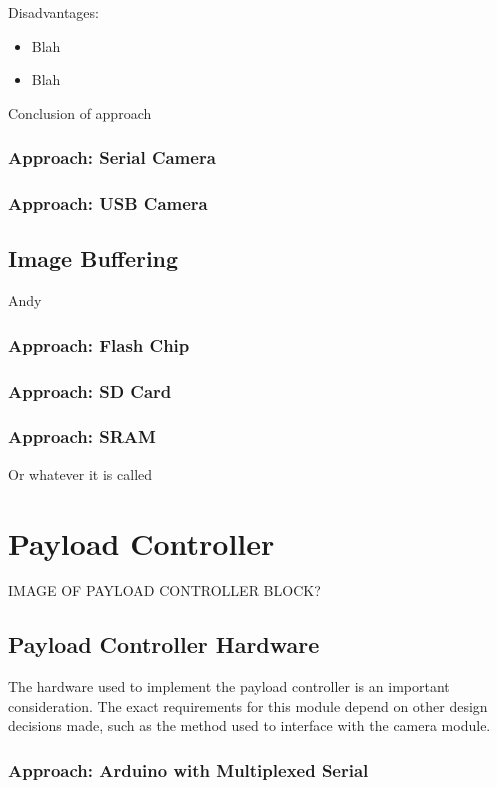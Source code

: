 \documentclass[oneside]{ecsgdp}         %
\begin{document}
Disadvantages:
\begin{itemize}
\item Blah
\item Blah
\end{itemize}

Conclusion of approach

\subsubsection{Approach: Serial Camera}

\subsubsection{Approach: USB Camera}


\subsection{Image Buffering}
Andy

\subsubsection{Approach: Flash Chip}

\subsubsection{Approach: SD Card}

\subsubsection{Approach: SRAM}
Or whatever it is called

\section{Payload Controller}
IMAGE OF PAYLOAD CONTROLLER BLOCK?

\subsection{Payload Controller Hardware}
The hardware used to implement the payload controller is an important consideration. The exact requirements for this module depend on other design decisions made, such as the method used to interface with the camera module. 

\subsubsection{Approach: Arduino with Multiplexed Serial}
\end{document}
